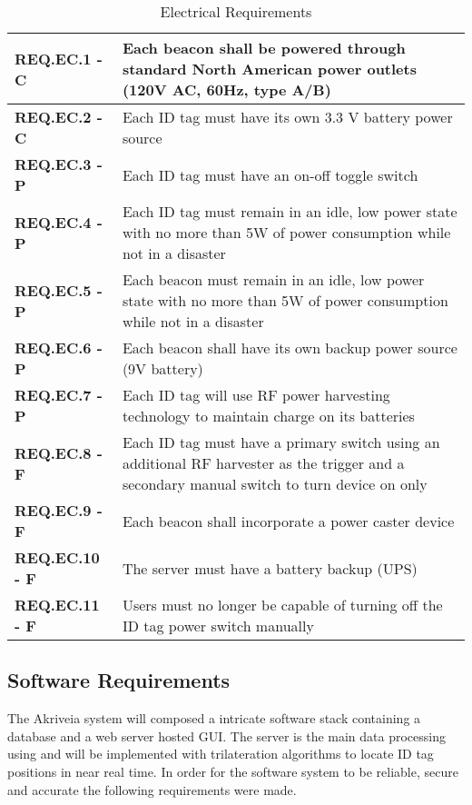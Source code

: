 \bgroup
\def\arraystretch{1.5}
\begin{table}[H]
\centering
\begin{tabular}{ | m{3.25cm} | m{12.5cm} |}
 \hline
 \textbf{REQ.EC.1 - C} & Each beacon shall be powered through standard North American power outlets (120V AC, 60Hz, type A/B) \\
\hline
 \textbf{REQ.EC.2 - C} & Each ID tag must have its own 3.3 V battery power source \\
\hline
 \textbf{REQ.EC.3 - P} & Each ID tag must have an on-off toggle switch  \\
\hline
 \textbf{REQ.EC.4 - P} &  Each ID tag must remain in an idle, low power state with no more than 5W of power consumption while not in a disaster  \\
\hline
 \textbf{REQ.EC.5 - P} &  Each beacon must remain in an idle, low power state with no more than 5W of power consumption while not in a disaster \\
\hline
 \textbf{REQ.EC.6 - P} & Each beacon shall have its own backup power source (9V battery)  \\
\hline
 \textbf{REQ.EC.7 - P} & Each ID tag will use RF power harvesting technology to maintain charge on its batteries \\
\hline
 \textbf{REQ.EC.8 - F} &  Each ID tag must have a primary switch using an additional RF harvester as the trigger and a secondary manual switch to turn device on only   \\
\hline
 \textbf{REQ.EC.9 - F} & Each beacon shall incorporate a power caster device \\
\hline
 \textbf{REQ.EC.10 - F} & The server must have a battery backup (UPS) \\
\hline
 \textbf{REQ.EC.11 - F} & Users must no longer be capable of turning off the ID tag power switch manually \\
\hline
\end{tabular}
\caption{Electrical Requirements}
\end{table}

\break
\subsection{Software Requirements}
The Akriveia system will composed a intricate software stack containing a database and a web server hosted GUI. The server is the main data processing using and will be implemented with trilateration algorithms to locate ID tag positions in near real time. In order for the software system to be reliable, secure and accurate the following requirements were made.

